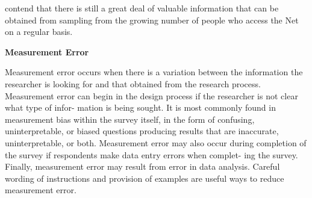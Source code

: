 \documentclass [10pt,a4paper]{book}
\begin{document}
contend that there is still a great deal of valuable information that can be obtained from
sampling from the growing number of people who access the Net on a regular basis.
\begin{flushleft}
\textbf{Measurement Error}
\end{flushleft}
Measurement error occurs when there is a variation between the information the
researcher is looking for and that obtained from the research process. Measurement
error can begin in the design process if the researcher is not clear what type of infor-
mation is being sought. It is most commonly found in measurement bias within the
survey itself, in the form of confusing, uninterpretable, or biased questions producing
results that are inaccurate, uninterpretable, or both. Measurement error may also occur
during completion of the survey if respondents make data entry errors when complet-
ing the survey. Finally, measurement error may result from error in data analysis.
Careful wording of instructions and provision of examples are useful ways to reduce
measurement error.
\end{document}
